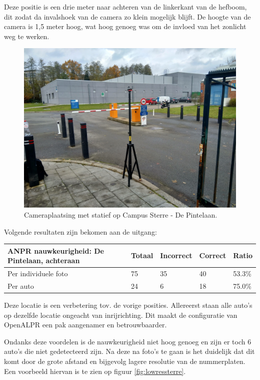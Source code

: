 Deze positie is een drie meter naar achteren van de linkerkant van de hefboom, dit zodat da invalshoek van de camera zo klein mogelijk blijft. De hoogte van de camera is 1,5 meter hoog, wat hoog genoeg was om de invloed van het zonlicht weg te werken.
\begin{figure}[h!]
	\centering
	\includegraphics[width=0.8\linewidth]{img/depintelaanstatief.jpg}
	\caption{Cameraplaatsing met statief op Campus Sterre - De Pintelaan.}
	\label{plaatsingdepintelaan}
\end{figure}

Volgende resultaten zijn bekomen aan de uitgang:
\begin{table}[h!]
	\centering
	\begin{tabular}{l|l|l|l|l}
		\textbf{ANPR nauwkeurigheid: De Pintelaan, achteraan} & Totaal & Incorrect & Correct & Ratio	\\ \hline
		Per individuele foto 	& 75 & 35	& 40	& 53.3\%\\
		Per auto				& 24 & 6	& 18 	& 75.0\%\\
	\end{tabular}
\end{table}

Deze locatie is een verbetering tov. de vorige posities. Allereerst staan alle auto's op dezelfde locatie ongeacht van inrijrichting. Dit maakt de configuratie van OpenALPR een pak aangenamer en betrouwbaarder.

Ondanks deze voordelen is de nauwkeurigheid niet hoog genoeg en zijn er toch 6 auto's die niet gedetecteerd zijn. Na deze na foto's te gaan is het duidelijk dat dit komt door de grote afstand en bijgevolg lagere resolutie van de nummerplaten. Een voorbeeld hiervan is te zien op figuur \ref{fig:lowressterre}.

